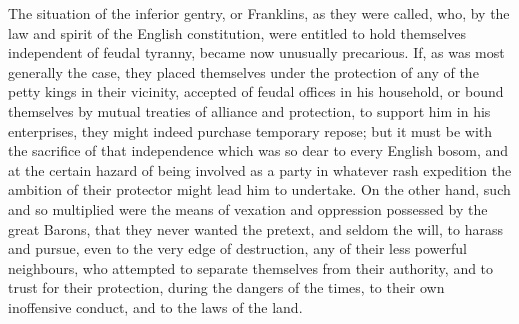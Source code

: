 The situation of the inferior gentry, or Franklins, as they were called,
who, by the law and spirit of the English constitution, were entitled to
hold themselves independent of feudal tyranny, became now unusually
precarious. If, as was most generally the case, they placed themselves
under the protection of any of the petty kings in their vicinity,
accepted of feudal offices in his household, or bound themselves by
mutual treaties of alliance and protection, to support him in his
enterprises, they might indeed purchase temporary repose; but it must be
with the sacrifice of that independence which was so dear to every
English bosom, and at the certain hazard of being involved as a party in
whatever rash expedition the ambition of their protector might lead him
to undertake. On the other hand, such and so multiplied were the means
of vexation and oppression possessed by the great Barons, that they
never wanted the pretext, and seldom the will, to harass and pursue,
even to the very edge of destruction, any of their less powerful
neighbours, who attempted to separate themselves from their authority,
and to trust for their protection, during the dangers of the times, to
their own inoffensive conduct, and to the laws of the land.

